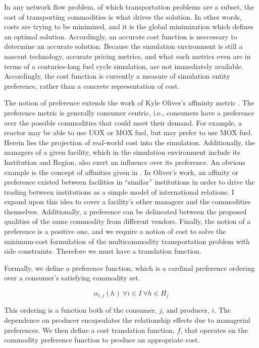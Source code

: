 In any network flow problem, of which transportation problems are a subset, the
cost of transporting commodities is what drives the solution. In other words,
costs are trying to be minimized, and it is the global minimization which
defines an optimal solution. Accordingly, an accurate cost function is
neccessary to determine an accurate solution. Because the \Cyclus simulation
environment is still a nascent technology, accurate pricing metrics, and what
such metrics even are in terms of a centuries-long fuel cycle simulation, are
not immediately available. Accordingly, the cost function is currently a measure
of simulation entity preference, rather than a concrete representation of cost.

The notion of preference extends the work of Kyle Oliver's affininty metric
\cite{oliver_geniusv2:_2009}. The preference metric is generally consumer
centric, i.e., consumers have a preference over the possible commodities that
could meet their demand. For example, a reactor may be able to use UOX or MOX
fuel, but may prefer to use MOX fuel. Herein lies the projection of real-world
cost into the simulation. Additionally, the managers of a given facility, which
in the \Cyclus simulation environment include its Institution and Region, also
exert an influence over its preference. An obvious example is the concept of
affinities given in \cite{oliver_geniusv2:_2009}. In Oliver's work, an affinity
or preference existed between facilities in ``similar'' institutions in order to
drive the trading between institutions as a simple model of international
relations. I expand upon this idea to cover a facility's other managers and
the commodities themselves. Additionally, a preference can be delineated between
the proposed qualities of the same commodity from different vendors. Finally,
the notion of a preference is a positive one, and we require a notion of cost to
solve the minimum-cost formulation of the multicommodity transportation problem
with side constraints. Therefore we must have a translation function.

Formally, we define a preference function, which is a cardinal preference
ordering over a consumer's satisfying commodity set.

\begin{equation}
\alpha_{i,j}(h) \: \forall i \in I \: \forall h \in H_{j} 
\end{equation}

This ordering is a function both of the consumer, $j$, and producer, $i$. The
dependence on producer encapsulates the relationship effects due to managerial
preferences. We then define a cost translation function, $f$, that operates on
the commodity preference function to produce an appropriate cost.

